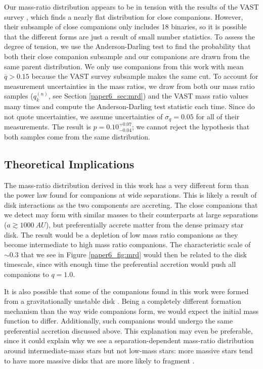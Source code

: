 Our mass-ratio distribution appears to be in tension with the results of the VAST survey \citep{DeRosa2014}, which finds a nearly flat distribution for close companions. However, their subsample of close companions only includes 18 binaries, so it is possible that the different forms are just a result of small number statistics. To assess the degree of tension, we use the Anderson-Darling  test \citep{Anderson1954} to find the probability that both their close companion subsample and our companions are drawn from the same parent distribution. We only use companions from this work with mean $\overline{q} > 0.15$ because the VAST survey subsample makes the same cut. To account for measurement uncertainties in the mass ratios, we draw from both our mass ratio samples ($q_k^{(n)}$, see Section \ref{paper6_sec:mrd}) and the VAST mass ratio values many times and compute the Anderson-Darling test statistic each time. Since \citet{DeRosa2014} do not quote uncertainties, we assume uncertainties of $\sigma_q = 0.05$ for all of their measurements. The result is $p = 0.10^{+0.07}_{-0.04}$; we cannot reject the hypothesis that both samples come from the same distribution.


\subsection{Theoretical Implications}
\label{paper6_subsec:theory}

The mass-ratio distribution derived in this work has a very different form than the power law found for companions at wide separations. This is likely a result of disk interactions as the two components are accreting. The close companions that we detect may form with similar masses to their counterparts at large separations ($a \gtrsim 1000\ AU$), but preferentially accrete matter from the dense primary star disk. The result would be a depletion of low mass ratio companions as they become intermediate to high mass ratio companions. The characteristic scale of $\sim 0.3$ that we see in Figure \ref{paper6_fig:mrd} would then be related to the disk timescale, since with enough time the preferential accretion would push all companions to $q = 1.0$. 

It is also possible that some of the companions found in this work were formed from a gravitationally unstable disk \citep[e.g.][]{Kratter2006, Stamatellos2011}. Being a completely different formation mechanism than the way wide companions form, we would expect the initial mass function to differ. Additionally, such companions would undergo the same preferential accretion discussed above. This explanation may even be preferable, since it could explain why we see a separation-dependent mass-ratio distribution around intermediate-mass stars but not low-mass stars: more massive stars tend to have more massive disks \citep{Andrews2013} that are more likely to fragment \citep{Kratter2010}.

